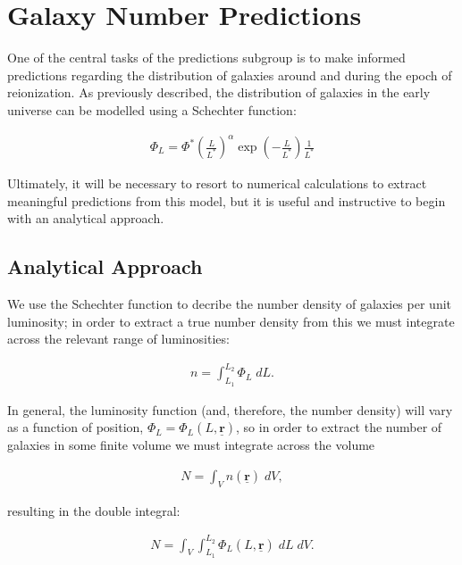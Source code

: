 \documentclass[pdf,color]{UoBnote}
\begin{document}



\section{ Galaxy Number Predictions}	%

One of the central tasks of the predictions subgroup is to make informed predictions regarding the distribution of galaxies around and during the epoch of reionization. As previously described, the distribution of galaxies in the early universe can be modelled using a Schechter function:

\begin{align}	
			\Phi_L = \Phi^*  \left(\frac{L}{L^*}\right)^\alpha \exp{\left( -\frac{L}{L^*} \right)} \frac{1}{L^*}
\end{align}

Ultimately, it will be necessary to resort to numerical calculations to extract meaningful predictions from this model, but it is useful and instructive to begin with an analytical approach.

\subsection{Analytical Approach}	%

We use the Schechter function to decribe the number density of galaxies per unit luminosity; in order to extract a true number density from this we must integrate across the relevant range of luminosities:

\begin{align}	
			n = \int_{L_1}^{L_2}  { \Phi_L \; dL } .		
\end{align}

In general, the luminosity function (and, therefore, the number density) will vary as a function of position, $\Phi_L = \Phi_L (L,\underline{\mathbf{r}})$, so in order to extract the number of galaxies in some finite volume we must integrate across the volume

\begin{align}	
			N = \int_V { n(\underline{\mathbf{r}}) \; dV } ,		
\end{align}

resulting in the double integral:

\begin{align}	
			N = \int_V { \int_{L_1}^{L_2}   { \Phi_L(L,\underline{\mathbf{r}})  \; dL } \; dV } .	
\end{align}
\end{document}
